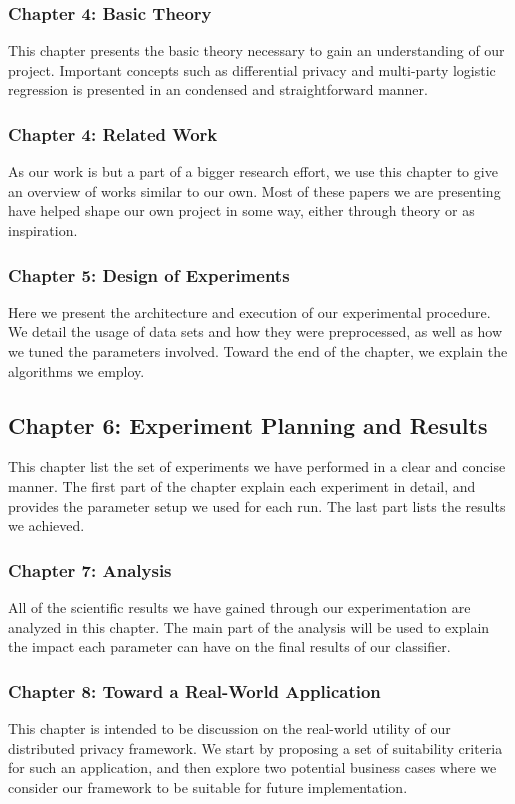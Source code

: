 \subsubsection{Chapter 4: Basic Theory}
This chapter presents the basic theory necessary to gain an understanding of our project. Important concepts such as differential privacy and multi-party logistic regression is presented in an condensed and straightforward manner.

\subsubsection{Chapter 4: Related Work}
As our work is but a part of a bigger research effort, we use this chapter to give an overview of works similar to our own. Most of these papers we are presenting have helped shape our own project in some way, either through theory or as inspiration.

\subsubsection{Chapter 5: Design of Experiments}
Here we present the architecture and execution of our experimental procedure. We detail the usage of data sets and how they were preprocessed, as well as how we tuned the parameters involved. Toward the end of the chapter, we explain the algorithms we employ.

\subsection{Chapter 6: Experiment Planning and Results}
This chapter list the set of experiments we have performed in a clear and concise manner. The first part of the chapter explain each experiment in detail, and provides the parameter setup we used for each run. The last part lists the results we achieved. 

\subsubsection{Chapter 7: Analysis}
All of the scientific results we have gained through our experimentation are analyzed in this chapter. The main part of the analysis will be used to explain the impact each parameter can have on the final results of our classifier.

\subsubsection{Chapter 8: Toward a Real-World Application}
This chapter is intended to be discussion on the real-world utility of our distributed privacy framework. We start by proposing a set of suitability criteria for such an application, and then explore two potential business cases where we consider our framework to be suitable for future implementation.   

